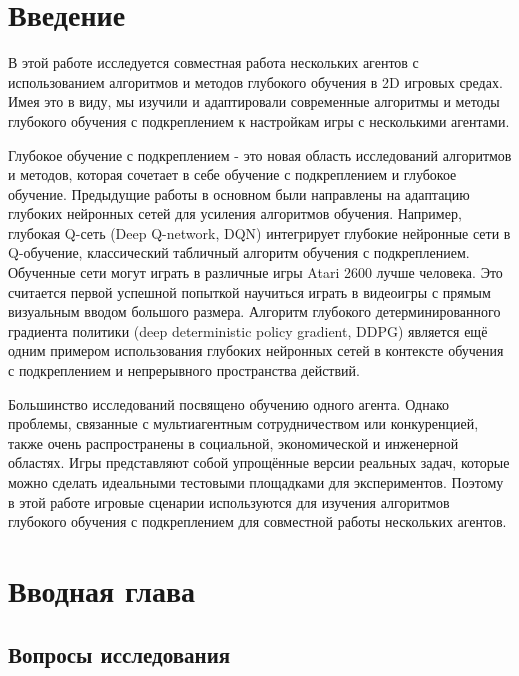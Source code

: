 \chapter*{Введение} %

В этой работе исследуется совместная работа нескольких агентов с использованием алгоритмов и методов глубокого обучения в 2D игровых средах. Имея это в виду, мы изучили и адаптировали современные алгоритмы и методы глубокого обучения с подкреплением к настройкам игры с несколькими агентами.

Глубокое обучение с подкреплением - это новая область исследований алгоритмов и методов, которая сочетает в себе обучение с подкреплением и глубокое обучение. Предыдущие работы в основном были направлены на адаптацию глубоких нейронных сетей для усиления алгоритмов обучения. Например, глубокая Q-сеть (Deep Q-network, DQN) \cite{Mnih2015} интегрирует глубокие нейронные сети в Q-обучение, классический табличный алгоритм обучения с подкреплением. Обученные сети могут играть в различные игры Atari 2600 \cite{Bellemare_2013} лучше человека. Это считается первой успешной попыткой научиться играть в видеоигры с прямым визуальным вводом большого размера. Алгоритм глубокого детерминированного градиента политики (deep deterministic policy gradient, DDPG) \cite{lillicrap2015continuous} является ещё одним примером использования глубоких нейронных сетей в контексте обучения с подкреплением и непрерывного пространства действий.

Большинство исследований посвящено обучению одного агента. Однако проблемы, связанные с мультиагентным сотрудничеством или конкуренцией, также очень распространены в социальной, экономической и инженерной областях. Игры представляют собой упрощённые версии реальных задач, которые можно сделать идеальными тестовыми площадками для экспериментов. Поэтому в этой работе игровые сценарии используются для изучения алгоритмов глубокого обучения с подкреплением для совместной работы нескольких агентов.

\chapter{Вводная глава}

\section{Вопросы исследования} \label{intro-questions}

